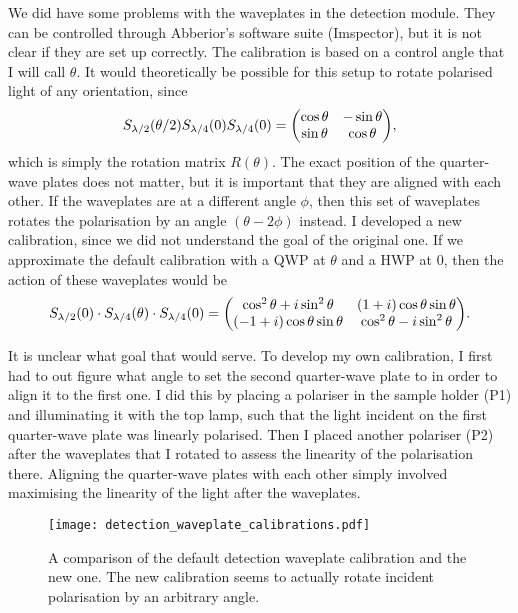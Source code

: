We did have some problems with the waveplates in the detection module. They can be controlled through Abberior's software suite (Imspector), but it is not clear if they are set up correctly. The calibration is based on a control angle that I will call $ \theta $. It would theoretically be possible for this setup to rotate polarised light of any orientation, since
\begin{equation}
	S_\hwp(\theta/2) S_\qwp(0) S_\qwp(0) = \mqty(\cos\theta & -\sin\theta \\ \sin\theta & \cos\theta ),
\end{equation}
which is simply the rotation matrix $ R(\theta) $. The exact position of the quarter-wave plates does not matter, but it is important that they are aligned with each other. If the waveplates are at a different angle $ \phi $, then this set of waveplates rotates the polarisation by an angle $ (\theta-2\phi) $ instead. I developed a new calibration, since we did not understand the goal of the original one. If we approximate the default calibration with a QWP at $ \theta $ and a HWP at 0, then the action of these waveplates would be
\begin{equation}
	S_\hwp(0)\cdot S_\qwp(\theta)\cdot S_\qwp(0) = 
		\mqty( \cos^2\theta + i\sin^2\theta & (1+i)\cos\theta\sin\theta \\
			   (-1+i)\cos\theta\sin\theta   & \cos^2\theta - i\sin^2\theta 
	    ).
\end{equation}

It is unclear what goal that would serve. To develop my own calibration, I first had to out figure what angle to set the second quarter-wave plate to in order to align it to the first one. I did this by placing a polariser in the sample holder (P1) and illuminating it with the top lamp, such that the light incident on the first quarter-wave plate was linearly polarised. Then I placed another polariser (P2) after the waveplates that I rotated to assess the linearity of the polarisation there. Aligning the quarter-wave plates with each other simply involved maximising the linearity of the light after the waveplates. 

\begin{figure}[h]
	\centering
	\texttt{[image: detection\_waveplate\_calibrations.pdf]}
	\caption{
		A comparison of the default detection waveplate calibration and the new one. The new calibration seems to actually rotate incident polarisation by an arbitrary angle.
	}
	\label{fig:detection waveplate calibrations}
\end{figure}




